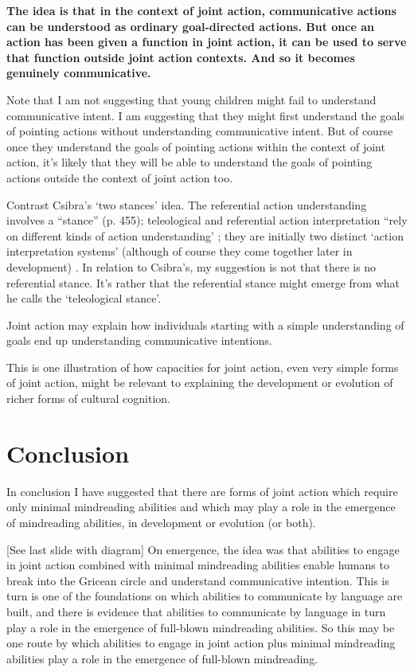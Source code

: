 \documentclass[12pt,a4paper]{extarticle}
\begin{document}
\textbf{
The idea is that in the context of joint action, communicative actions can be understood as ordinary goal-directed actions.
But once an action has been given a function in joint action, it can be used to serve that function outside joint action contexts.  And so it becomes genuinely communicative.
}

Note that I am not suggesting that young children might fail to understand communicative intent.
I am suggesting that they might first understand the goals of pointing actions without understanding communicative intent.
But of course once they understand the goals of pointing actions within the context of joint action, it's likely that they will be able to understand the goals of pointing actions outside the context of joint action too.

Contrast Csibra's `two stances' idea. The referential action understanding involves a “stance” (p. 455); teleological and referential action interpretation “rely on different kinds of action understanding' \citep[p.\ 456]{Csibra:2003kp}; they are initially two distinct `action interpretation systems' (although of course they come together later in development)  \citep[p.\ 456]{Csibra:2003kp}.
In relation to Csibra's, my suggestion is not that there is no referential stance.
It's rather that the referential stance might emerge from what he calls the `teleological stance'.


Joint action may explain how individuals starting with a simple understanding of goals end up understanding communicative intentions.

This is one illustration of how capacities for joint action, even very simple forms of joint action, might be relevant to explaining the development or evolution of richer forms of cultural cognition.



\section{Conclusion}
In conclusion I have suggested that there are forms of joint action which require only minimal mindreading abilities and which may play a role in the emergence of mindreading abilities, in development or evolution (or both).

[See last slide with diagram] On emergence, the idea was that abilities to engage in joint action combined with minimal mindreading abilities enable humans to break into the Gricean circle and understand communicative intention.
This is turn is one of the foundations on which abilities to communicate by language are built,
and there is evidence that abilities to communicate by language in turn play a role in the emergence of full-blown mindreading abilities.
So this may be one route by which abilities to engage in joint action plus minimal mindreading abilities play a role in the emergence of full-blown mindreading.




\end{document}
